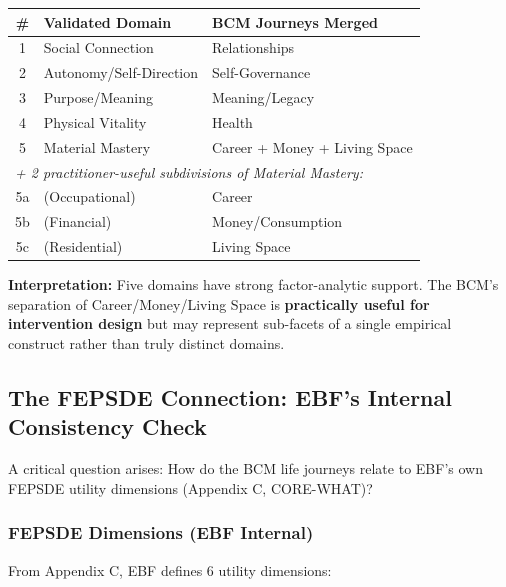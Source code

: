 \begin{center}
\begin{tabular}{@{}clp{5cm}@{}}
\toprule
\textbf{\#} & \textbf{Validated Domain} & \textbf{BCM Journeys Merged} \\
\midrule
1 & Social Connection & Relationships \\
2 & Autonomy/Self-Direction & Self-Governance \\
3 & Purpose/Meaning & Meaning/Legacy \\
4 & Physical Vitality & Health \\
5 & Material Mastery & Career + Money + Living Space \\
\midrule
\multicolumn{3}{l}{\textit{+ 2 practitioner-useful subdivisions of Material Mastery:}} \\
5a & (Occupational) & Career \\
5b & (Financial) & Money/Consumption \\
5c & (Residential) & Living Space \\
\bottomrule
\end{tabular}
\end{center}

\textbf{Interpretation:} Five domains have strong factor-analytic support. The BCM's separation of Career/Money/Living Space is \textbf{practically useful for intervention design} but may represent sub-facets of a single empirical construct rather than truly distinct domains.


\subsection{The FEPSDE Connection: EBF's Internal Consistency Check}
\label{sec:bj-fepsde}

A critical question arises: How do the BCM life journeys relate to EBF's own FEPSDE utility dimensions (Appendix C, CORE-WHAT)?

\subsubsection{FEPSDE Dimensions (EBF Internal)}

From Appendix C, EBF defines 6 utility dimensions:

